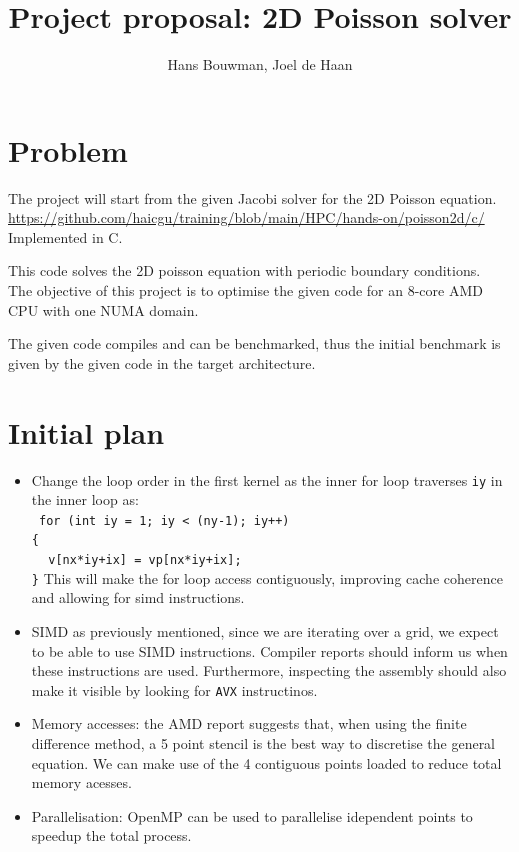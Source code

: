 \documentclass{article}
\title{Project proposal: 2D Poisson solver}
\author{Hans Bouwman, Joel de Haan}
\begin{document}
\maketitle

\section{Problem}

The project will start from the given Jacobi solver for the 2D Poisson equation.
\url{https://github.com/haicgu/training/blob/main/HPC/hands-on/poisson2d/c/}
Implemented in C.

This code solves the 2D poisson equation with periodic boundary conditions. \\

The objective of this project is to optimise the given code for an 8-core AMD CPU with one NUMA domain. 

The given code compiles and can be benchmarked, thus the initial benchmark is given by the given code in the target architecture.

\section{Initial plan}
\begin{itemize}
    \item Change the loop order in the first kernel as the inner for loop traverses \texttt{iy} in the inner loop as:\\
    \texttt{ for (int iy = 1; iy < (ny-1); iy++)\\
            \{\\
                $\text{ }$ \hspace{0.6cm}v[nx*iy+ix] = vp[nx*iy+ix];\\
            \}}
    This will make the for loop access contiguously, improving cache coherence and allowing for simd instructions.
    \item SIMD as previously mentioned, since we are iterating over a grid, we expect to be able to use SIMD instructions. Compiler reports should inform us when these instructions are used. Furthermore, inspecting the assembly should also make it visible by looking for \texttt{AVX} instructinos.

    \item Memory accesses: the AMD report suggests that, when using the finite difference method, a 5 point stencil is the best way to discretise the general equation. We can make use of the 4 contiguous points loaded to reduce total memory acesses.

\item Parallelisation: OpenMP can be used to parallelise idependent points to speedup the total process. 
    \end{itemize}
\end{document}

